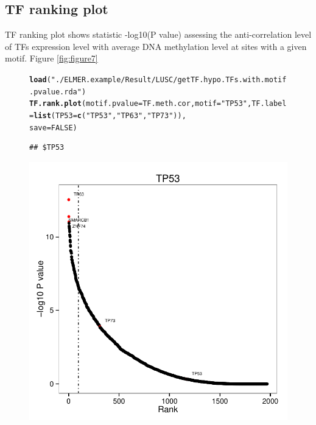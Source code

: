 \documentclass{article}\usepackage[]{graphicx}\usepackage[usenames,dvipsnames]{color}
\makeatletter
\def\maxwidth{ %
  \ifdim\Gin@nat@width>\linewidth
    \linewidth
  \else
    \Gin@nat@width
  \fi
}
\newcommand{\hlnum}[1]{\textcolor[rgb]{0.686,0.059,0.569}{#1}}%
\newcommand{\hlstr}[1]{\textcolor[rgb]{0.192,0.494,0.8}{#1}}%
\newcommand{\hlstd}[1]{\textcolor[rgb]{0.345,0.345,0.345}{#1}}%
\newcommand{\hlkwc}[1]{\textcolor[rgb]{0.333,0.667,0.333}{#1}}%
\newcommand{\hlkwd}[1]{\textcolor[rgb]{0.737,0.353,0.396}{\textbf{#1}}}%
\newenvironment{kframe}{%
 \def\at@end@of@kframe{}%
 \ifinner\ifhmode%
  \def\at@end@of@kframe{\end{minipage}}%
  \begin{minipage}{\columnwidth}%
 \fi\fi%
 \def\FrameCommand##1{\hskip\@totalleftmargin \hskip-\fboxsep
 \colorbox{shadecolor}{##1}\hskip-\fboxsep
     \hskip-\linewidth \hskip-\@totalleftmargin \hskip\columnwidth}%
 \MakeFramed {\advance\hsize-\width
   \@totalleftmargin\z@ \linewidth\hsize
   \@setminipage}}%
 {\par\unskip\endMakeFramed%
 \at@end@of@kframe}
\newenvironment{knitrout}{}{} %
\makeatother
\begin{document}
\subsection{TF ranking plot}
TF ranking plot shows statistic -log10(P value) assessing the anti-correlation level 
of TFs expression level with average DNA methylation level at sites with a given motif. Figure \ref{fig:figure7}

\begin{figure}[H]
\begin{knitrout}
\color{fgcolor}\begin{kframe}
\begin{alltt}
\hlkwd{load}\hlstd{(}\hlstr{"./ELMER.example/Result/LUSC/getTF.hypo.TFs.with.motif.pvalue.rda"}\hlstd{)}
\hlkwd{TF.rank.plot}\hlstd{(}\hlkwc{motif.pvalue}\hlstd{=TF.meth.cor,} \hlkwc{motif}\hlstd{=}\hlstr{"TP53"}\hlstd{,} \hlkwc{TF.label}\hlstd{=}\hlkwd{list}\hlstd{(}\hlkwc{TP53}\hlstd{=}\hlkwd{c}\hlstd{(}\hlstr{"TP53"}\hlstd{,}\hlstr{"TP63"}\hlstd{,}\hlstr{"TP73"}\hlstd{)),}
            \hlkwc{save}\hlstd{=}\hlnum{FALSE}\hlstd{)}
\end{alltt}
\begin{verbatim}
## $TP53
\end{verbatim}
\end{kframe}

{\centering \includegraphics[width=\maxwidth]{figure/figure7-1} 

}
\end{knitrout}
\end{figure}
\end{document}
